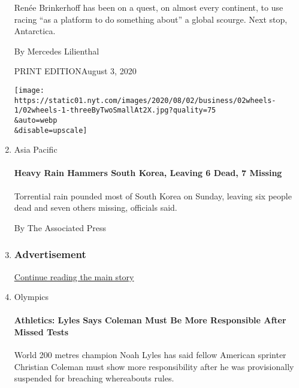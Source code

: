 \begin{enumerate}
  Renée Brinkerhoff has been on a quest, on almost every continent, to
  use racing ``as a platform to do something about'' a global scourge.
  Next stop, Antarctica.

  By Mercedes Lilienthal

  PRINT EDITIONAugust 3, 2020

  \texttt{[image: https://static01.nyt.com/images/2020/08/02/business/02wheels-1/02wheels-1-threeByTwoSmallAt2X.jpg?quality=75\\\&auto=webp\\\&disable=upscale]}
\item
  Asia Pacific

  \href{/aponline/2020/08/02/world/asia/ap-as-skorea-heavy-rain.html?searchResultPosition=4}{}

  \hypertarget{heavy-rain-hammers-south-korea-leaving-6-dead-7-missing}{%
  \paragraph{Heavy Rain Hammers South Korea, Leaving 6 Dead, 7
  Missing}\label{heavy-rain-hammers-south-korea-leaving-6-dead-7-missing}}

  Torrential rain pounded most of South Korea on Sunday, leaving six
  people dead and seven others missing, officials said.

  By The Associated Press
\item
  \hypertarget{advertisement}{%
  \subsubsection{Advertisement}\label{advertisement}}

  \protect\hyperlink{after-mid748}{Continue reading the main story}
\item
  Olympics

  \href{/reuters/2020/08/02/sports/olympics/02reuters-athletics-usa-lyles-coleman.html?searchResultPosition=5}{}

  \hypertarget{athletics-lyles-says-coleman-must-be-more-responsible-after-missed-tests}{%
  \paragraph{Athletics: Lyles Says Coleman Must Be More Responsible
  After Missed
  Tests}\label{athletics-lyles-says-coleman-must-be-more-responsible-after-missed-tests}}

  World 200 metres champion Noah Lyles has said fellow American sprinter
  Christian Coleman must show more responsibility after he was
  provisionally suspended for breaching whereabouts rules.


\end{enumerate}
